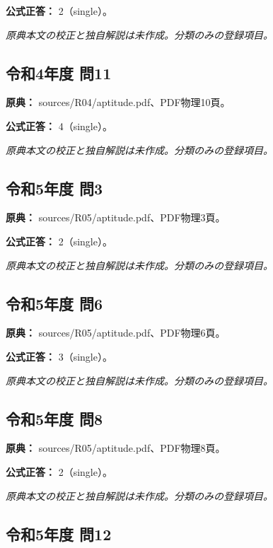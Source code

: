 \textbf{公式正答：} 2（single）。

\par\textit{原典本文の校正と独自解説は未作成。分類のみの登録項目。}

\subsection{令和4年度 問11}
\label{q:r04-reg-apt-11}

\noindent\textbf{原典：} sources/R04/aptitude.pdf、PDF物理10頁。

\textbf{公式正答：} 4（single）。

\par\textit{原典本文の校正と独自解説は未作成。分類のみの登録項目。}

\subsection{令和5年度 問3}
\label{q:r05-reg-apt-03}

\noindent\textbf{原典：} sources/R05/aptitude.pdf、PDF物理3頁。

\textbf{公式正答：} 2（single）。

\par\textit{原典本文の校正と独自解説は未作成。分類のみの登録項目。}

\subsection{令和5年度 問6}
\label{q:r05-reg-apt-06}

\noindent\textbf{原典：} sources/R05/aptitude.pdf、PDF物理6頁。

\textbf{公式正答：} 3（single）。

\par\textit{原典本文の校正と独自解説は未作成。分類のみの登録項目。}

\subsection{令和5年度 問8}
\label{q:r05-reg-apt-08}

\noindent\textbf{原典：} sources/R05/aptitude.pdf、PDF物理8頁。

\textbf{公式正答：} 2（single）。

\par\textit{原典本文の校正と独自解説は未作成。分類のみの登録項目。}

\subsection{令和5年度 問12}
\label{q:r05-reg-apt-12}

